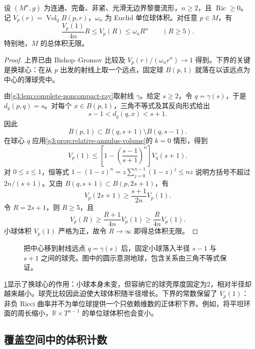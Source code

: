 \begin{theorem}\label{g3:thm:noncompact-volume-growth}
	设 \((M^n,g)\) 为连通、完备、非紧、光滑无边界黎曼流形，\(n\ge2\)，且 \(\operatorname{Ric}\ge0\)。记 \(V_p(r)=\operatorname{Vol}_g B(p,r)\)，\(\omega_n\) 为 Euclid 单位球体积。对任意 \(p\in M\)，有
	\begin{equation}\label{g3:eq:noncompact-linear-volume}
		\frac{V_p(1)}{4n}R
		\le V_p(R)\le\omega_nR^n
		\qquad(R\ge5).
	\end{equation}
	特别地，\(M\) 的总体积无限。
\end{theorem}
\begin{proof}
	上界已由 Bishop--Gromov 比较及 \(V_p(r)/(\omega_nr^n)\to1\) 得到。下界的关键是换球心：在从 \(p\) 出发的射线上取一个远点，固定球 \(B(p,1)\) 就落在以该远点为中心的薄球壳中。

	由\cref{g3:lem:complete-noncompact-ray}取射线 \(\gamma\)。给定 \(s\ge2\)，令 \(q=\gamma(s)\)，于是 \(d_g(p,q)=s\)。对每个 \(x\in B(p,1)\)，三角不等式及其反向形式给出
	\[
		s-1<d_g(q,x)<s+1.
	\]
	因此
	\[
		B(p,1)\subset B(q,s+1)\setminus B(q,s-1).
	\]
	在球心 \(q\) 应用\cref{g3:prop:relative-annulus-volume}的 \(k=0\) 情形，得到
	\[
		V_p(1)
		\le\left[1-\left(\frac{s-1}{s+1}\right)^n\right]V_q(s+1).
	\]
	对 \(0\le z\le1\)，恒等式
	\(1-(1-z)^n=z\sum_{j=0}^{n-1}(1-z)^j\le nz\)
	说明方括号不超过 \(2n/(s+1)\)。又由
	\(B(q,s+1)\subset B(p,2s+1)\)，有
	\[
		V_p(2s+1)\ge\frac{s+1}{2n}V_p(1).
	\]
	令 \(R=2s+1\)，则 \(R\ge5\)，且
	\[
		V_p(R)\ge\frac{R+1}{4n}V_p(1)
		\ge\frac{R}{4n}V_p(1).
	\]
	小球体积 \(V_p(1)\) 严格为正，故令 \(R\to\infty\) 即得总体积无限。
\end{proof}

\begin{figure}[htbp]
	\centering
	
	\caption{把中心移到射线远点 \(q=\gamma(s)\) 后，固定小球落入半径 \(s-1\) 与 \(s+1\) 之间的球壳。图中的圆示意测地球，包含关系由三角不等式保证。}
	\label{g3:fig:ray-annulus}
\end{figure}

\cref{g3:fig:ray-annulus}显示了换球心的作用：小球本身未变，但容纳它的球壳厚度固定为2，相对半径却越来越小。球壳比较因此迫使大球体积随半径增长。下界的常数保留了 \(V_p(1)\)：非负 Ricci 曲率并不为单位球提供一个只依赖维数的正体积下界。例如，将平坦环面的周长缩小，\(\mathbb R\times T^{n-1}\) 的单位球体积也会变小。

\subsection{覆盖空间中的体积计数}
\label{g3:subsec:0803:02}

